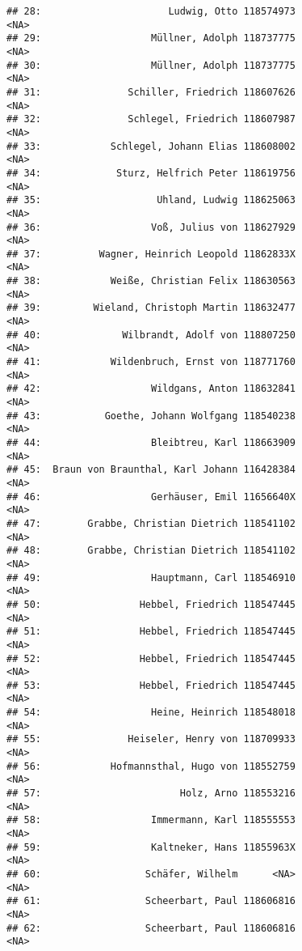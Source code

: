 \documentclass[]{book}
\begin{document}
\begin{verbatim}
## 28:                      Ludwig, Otto 118574973                     <NA>
## 29:                   Müllner, Adolph 118737775                     <NA>
## 30:                   Müllner, Adolph 118737775                     <NA>
## 31:               Schiller, Friedrich 118607626                     <NA>
## 32:               Schlegel, Friedrich 118607987                     <NA>
## 33:            Schlegel, Johann Elias 118608002                     <NA>
## 34:             Sturz, Helfrich Peter 118619756                     <NA>
## 35:                    Uhland, Ludwig 118625063                     <NA>
## 36:                   Voß, Julius von 118627929                     <NA>
## 37:          Wagner, Heinrich Leopold 11862833X                     <NA>
## 38:            Weiße, Christian Felix 118630563                     <NA>
## 39:         Wieland, Christoph Martin 118632477                     <NA>
## 40:              Wilbrandt, Adolf von 118807250                     <NA>
## 41:            Wildenbruch, Ernst von 118771760                     <NA>
## 42:                   Wildgans, Anton 118632841                     <NA>
## 43:           Goethe, Johann Wolfgang 118540238                     <NA>
## 44:                   Bleibtreu, Karl 118663909                     <NA>
## 45:  Braun von Braunthal, Karl Johann 116428384                     <NA>
## 46:                   Gerhäuser, Emil 11656640X                     <NA>
## 47:        Grabbe, Christian Dietrich 118541102                     <NA>
## 48:        Grabbe, Christian Dietrich 118541102                     <NA>
## 49:                   Hauptmann, Carl 118546910                     <NA>
## 50:                 Hebbel, Friedrich 118547445                     <NA>
## 51:                 Hebbel, Friedrich 118547445                     <NA>
## 52:                 Hebbel, Friedrich 118547445                     <NA>
## 53:                 Hebbel, Friedrich 118547445                     <NA>
## 54:                   Heine, Heinrich 118548018                     <NA>
## 55:               Heiseler, Henry von 118709933                     <NA>
## 56:            Hofmannsthal, Hugo von 118552759                     <NA>
## 57:                        Holz, Arno 118553216                     <NA>
## 58:                   Immermann, Karl 118555553                     <NA>
## 59:                   Kaltneker, Hans 11855963X                     <NA>
## 60:                  Schäfer, Wilhelm      <NA>                     <NA>
## 61:                  Scheerbart, Paul 118606816                     <NA>
## 62:                  Scheerbart, Paul 118606816                     <NA>

\end{verbatim}
\end{document}
